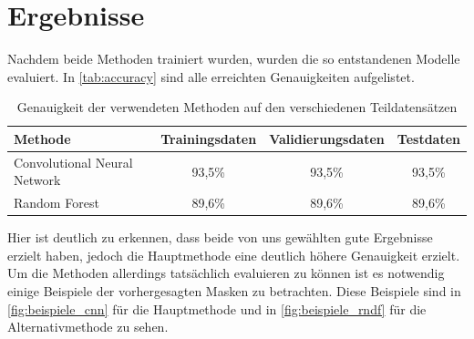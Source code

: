 \section{Ergebnisse}
\label{sec:Ergebnisse}

Nachdem beide Methoden trainiert wurden, wurden die so entstandenen Modelle evaluiert.
In \autoref{tab:accuracy} sind alle erreichten Genauigkeiten aufgelistet.

\begin{table}
    \centering
    \caption{Genauigkeit der verwendeten Methoden auf den verschiedenen Teildatensätzen}
    \label{tab:accuracy}
    \begin{tabular}{l c c c}
        \toprule 
        Methode & Trainingsdaten & Validierungsdaten & Testdaten \\ 
        \midrule 
        Convolutional Neural Network & 93,5\% & 93,5\% & 93,5\% \\
        Random Forest & 89,6\% & 89,6\% & 89,6\% \\
        \bottomrule
    \end{tabular}
\end{table}

Hier ist deutlich zu erkennen, dass beide von uns gewählten gute Ergebnisse erzielt haben, jedoch die Hauptmethode eine deutlich höhere Genauigkeit erzielt.
Um die Methoden allerdings tatsächlich evaluieren zu können ist es notwendig einige Beispiele der vorhergesagten Masken zu betrachten.
Diese Beispiele sind in \autoref{fig:beispiele_cnn} für die Hauptmethode und in \autoref{fig:beispiele_rndf} für die Alternativmethode zu sehen.

